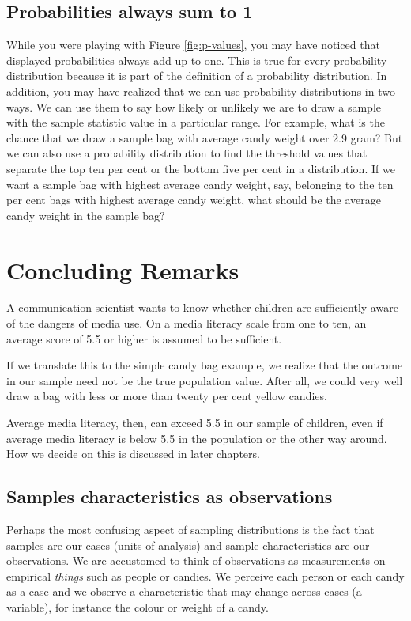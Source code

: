 \documentclass[a4paper]{book}
\theoremstyle{definition}
\theoremstyle{definition}
\theoremstyle{definition}
\theoremstyle{remark}
\begin{document}
\subsection{Probabilities always sum to
1}\label{probabilities-always-sum-to-1}

While you were playing with Figure \ref{fig:p-values}, you may have
noticed that displayed probabilities always add up to one. This is true
for every probability distribution because it is part of the definition
of a probability distribution. In addition, you may have realized that
we can use probability distributions in two ways. We can use them to say
how likely or unlikely we are to draw a sample with the sample statistic
value in a particular range. For example, what is the chance that we
draw a sample bag with average candy weight over 2.9 gram? But we can
also use a probability distribution to find the threshold values that
separate the top ten per cent or the bottom five per cent in a
distribution. If we want a sample bag with highest average candy weight,
say, belonging to the ten per cent bags with highest average candy
weight, what should be the average candy weight in the sample bag?

\section{Concluding Remarks}\label{concluding-remarks}

A communication scientist wants to know whether children are
sufficiently aware of the dangers of media use. On a media literacy
scale from one to ten, an average score of 5.5 or higher is assumed to
be sufficient.

If we translate this to the simple candy bag example, we realize that
the outcome in our sample need not be the true population value. After
all, we could very well draw a bag with less or more than twenty per
cent yellow candies.

Average media literacy, then, can exceed 5.5 in our sample of children,
even if average media literacy is below 5.5 in the population or the
other way around. How we decide on this is discussed in later chapters.

\subsection{Samples characteristics as
observations}\label{samples-characteristics-as-observations}

Perhaps the most confusing aspect of sampling distributions is the fact
that samples are our cases (units of analysis) and sample
characteristics are our observations. We are accustomed to think of
observations as measurements on empirical \emph{things} such as people
or candies. We perceive each person or each candy as a case and we
observe a characteristic that may change across cases (a variable), for
instance the colour or weight of a candy.
\end{document}
